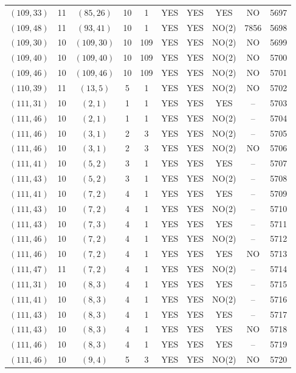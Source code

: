 \begin{longtable}{|c|c|c|c|c|c|c|c|c|c|}
$(109, 33)$ & 11 & $(85, 26)$ & 10 & 1 & YES & YES & YES & NO & 5697\\
$(109, 48)$ & 11 & $(93, 41)$ & 10 & 1 & YES & YES & NO(2) & 7856 & 5698\\
$(109, 30)$ & 10 & $(109, 30)$ & 10 & 109 & YES & YES & NO(2) & NO & 5699\\
$(109, 40)$ & 10 & $(109, 40)$ & 10 & 109 & YES & YES & NO(2) & NO & 5700\\
$(109, 46)$ & 10 & $(109, 46)$ & 10 & 109 & YES & YES & NO(2) & NO & 5701\\
$(110, 39)$ & 11 & $(13, 5)$ & 5 & 1 & YES & YES & NO(2) & NO & 5702\\
$(111, 31)$ & 10 & $(2, 1)$ & 1 & 1 & YES & YES & YES & -- & 5703\\
$(111, 46)$ & 10 & $(2, 1)$ & 1 & 1 & YES & YES & NO(2) & -- & 5704\\
$(111, 46)$ & 10 & $(3, 1)$ & 2 & 3 & YES & YES & NO(2) & -- & 5705\\
$(111, 46)$ & 10 & $(3, 1)$ & 2 & 3 & YES & YES & NO(2) & NO & 5706\\
$(111, 41)$ & 10 & $(5, 2)$ & 3 & 1 & YES & YES & YES & -- & 5707\\
$(111, 43)$ & 10 & $(5, 2)$ & 3 & 1 & YES & YES & NO(2) & -- & 5708\\
$(111, 41)$ & 10 & $(7, 2)$ & 4 & 1 & YES & YES & YES & -- & 5709\\
$(111, 43)$ & 10 & $(7, 2)$ & 4 & 1 & YES & YES & NO(2) & -- & 5710\\
$(111, 43)$ & 10 & $(7, 3)$ & 4 & 1 & YES & YES & YES & -- & 5711\\
$(111, 46)$ & 10 & $(7, 2)$ & 4 & 1 & YES & YES & NO(2) & -- & 5712\\
$(111, 46)$ & 10 & $(7, 2)$ & 4 & 1 & YES & YES & YES & NO & 5713\\
$(111, 47)$ & 11 & $(7, 2)$ & 4 & 1 & YES & YES & NO(2) & -- & 5714\\
$(111, 31)$ & 10 & $(8, 3)$ & 4 & 1 & YES & YES & YES & -- & 5715\\
$(111, 41)$ & 10 & $(8, 3)$ & 4 & 1 & YES & YES & NO(2) & -- & 5716\\
$(111, 43)$ & 10 & $(8, 3)$ & 4 & 1 & YES & YES & YES & -- & 5717\\
$(111, 43)$ & 10 & $(8, 3)$ & 4 & 1 & YES & YES & YES & NO & 5718\\
$(111, 46)$ & 10 & $(8, 3)$ & 4 & 1 & YES & YES & YES & -- & 5719\\
$(111, 46)$ & 10 & $(9, 4)$ & 5 & 3 & YES & YES & NO(2) & NO & 5720\\

\end{longtable}
